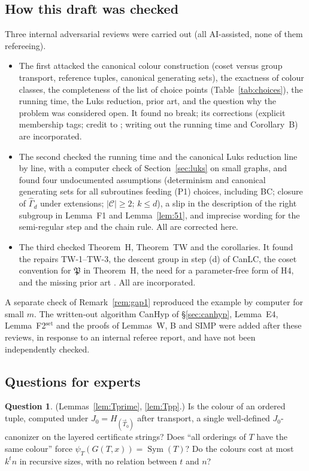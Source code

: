 \documentclass[11pt]{article}
\theoremstyle{plain}
\theoremstyle{definition}
\newtheorem{question}[theorem]{Question}
\theoremstyle{remark}
\theoremstyle{named}
\theoremstyle{namedrm}
\newcommand{\Sym}{\operatorname{Sym}}
\newcommand{\Gd}{\widehat{\Gamma}_d}
\newcommand{\fP}{\mathfrak{P}}
\newcommand{\cC}{\mathcal{C}}
\newcommand{\vT}{\vec{T}}
\begin{document}
\subsection{How this draft was checked}

Three internal adversarial reviews were carried out (all AI-assisted, none of them refereeing).
\begin{itemize}
\item The first attacked the canonical colour construction (coset versus group transport, reference tuples,
  canonical generating sets), the exactness of colour classes, the completeness of the list of choice points
  (Table~\ref{tab:choices}), the running time, the Luks reduction, prior art, and the question why the problem
  was considered open. It found no break; its corrections (explicit membership tags; credit to
  \cite[Lemma~5.34]{Wie21}; writing out the running time and Corollary~B) are incorporated.
\item The second checked the running time and the canonical Luks reduction line by line, with a computer
  check of Section~\ref{sec:luks} on small graphs, and found four undocumented assumptions (determinism and
  canonical generating sets for all subroutines feeding (P1) choices, including BC; closure of $\Gd$ under
  extensions; $|\cC|\ge2$; $k\le d$), a slip in the description of the right subgroup in Lemma~F1 and
  Lemma~\ref{lem:51}, and imprecise wording for the semi-regular step and the chain rule. All are corrected
  here.
\item The third checked Theorem~H, Theorem~TW and the corollaries. It found the repairs TW-1--TW-3, the
  descent group in step (d) of CanLC, the coset convention for $\fP$ in Theorem~H, the need for a
  parameter-free form of H4, and the missing prior art \cite{Gro12,Gro17,LPPS22}. All are incorporated.
\end{itemize}
A separate check of Remark~\ref{rem:gap1} reproduced the example by computer for small $m$.
The written-out algorithm CanHyp of \S\ref{sec:canhyp}, Lemma~E4, Lemma~F2$^{\text{set}}$ and the proofs of Lemmas~W, B and
SIMP were added after these reviews, in response to an internal referee report, and have not been independently
checked.

\subsection{Questions for experts}

\begin{question}\label{q:T}
(Lemmas~\ref{lem:Tprime}, \ref{lem:Tpp}.) Is the colour of an ordered tuple, computed under $J_0=H_{(\vT_0)}$
after transport, a single well-defined $J_0$-canonizer on the layered certificate strings? Does ``all
orderings of $T$ have the same colour'' force $\psi_T(G(T,x))=\Sym(T)$? Do the colours cost at most $k^tn$ in
recursive sizes, with no relation between $t$ and $n$?
\end{question}
\end{document}

